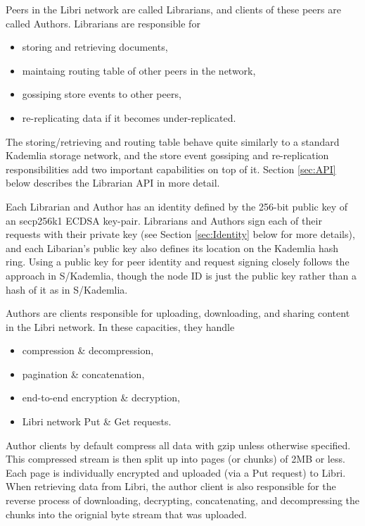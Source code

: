 \documentclass[10pt]{article}
\begin{document}
Peers in the Libri network are called Librarians, and clients of these peers are called Authors. Librarians are responsible for 
\begin{itemize}
	\item storing and retrieving documents,
	\item maintaing routing table of other peers in the network,
	\item gossiping store events to other peers,
	\item re-replicating data if it becomes under-replicated.
\end{itemize}
The storing/retrieving and routing table behave quite similarly to a standard Kademlia \cite{kademlia} storage network, and the store event gossiping and re-replication responsibilities add two important capabilities on top of it. Section \ref{sec:API} below describes the Librarian API in more detail.

Each Librarian and Author has an identity defined by the 256-bit public key of an secp256k1 ECDSA key-pair. Librarians and Authors sign each of their requests with their private key (see Section \ref{sec:Identity} below for more details), and each Libarian's public key also defines its location on the Kademlia hash ring. Using a public key for peer identity and request signing closely follows the approach in S/Kademlia, though the node ID is just the public key rather than a hash of it as in S/Kademlia. 

Authors are clients responsible for uploading, downloading, and sharing content in the Libri network. In these capacities, they handle
\begin{itemize}
	\item compression \& decompression,
	\item pagination \& concatenation,
	\item end-to-end encryption \& decryption,
	\item Libri network Put \& Get requests.
\end{itemize}

Author clients by default compress all data with gzip unless otherwise specified. This compressed stream is then split up into pages (or chunks) of 2MB or less. Each page is individually encrypted and uploaded (via a Put request) to Libri. When retrieving data from Libri, the author client is also responsible for the reverse process of downloading, decrypting, concatenating, and decompressing the chunks into the orignial byte stream that was uploaded.
\end{document}
